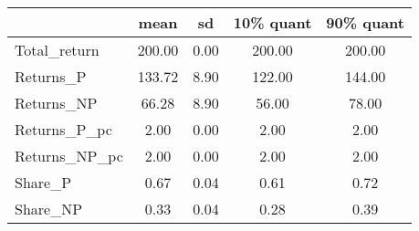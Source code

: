 \begin{tabular}{lcccc}
\toprule
{} &    mean &    sd &  10\% quant &  90\% quant \\
\midrule
Total\_return  &  200.00 &  0.00 &     200.00 &     200.00 \\
Returns\_P     &  133.72 &  8.90 &     122.00 &     144.00 \\
Returns\_NP    &   66.28 &  8.90 &      56.00 &      78.00 \\
Returns\_P\_pc  &    2.00 &  0.00 &       2.00 &       2.00 \\
Returns\_NP\_pc &    2.00 &  0.00 &       2.00 &       2.00 \\
Share\_P       &    0.67 &  0.04 &       0.61 &       0.72 \\
Share\_NP      &    0.33 &  0.04 &       0.28 &       0.39 \\
\bottomrule
\end{tabular}
